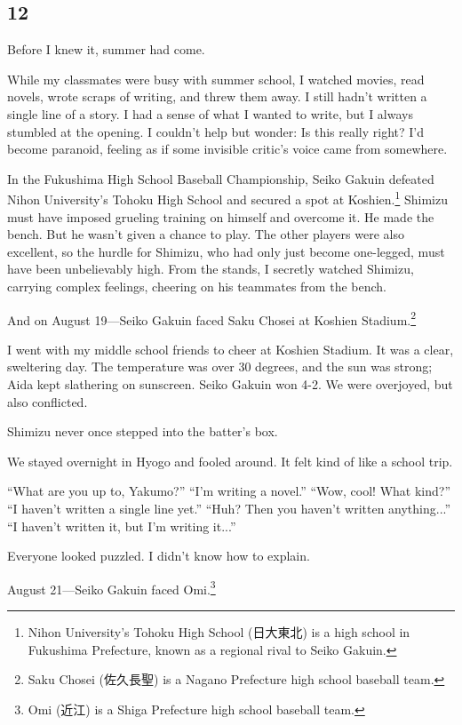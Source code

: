 \documentclass[
    a4paper,
    12pt,
    twoside,
    openany,
    UTF8,
    fontset=windows
]{ctexbook}
\begin{document}
\subsection*{12}

Before I knew it, summer had come.

While my classmates were busy with summer school, I watched movies, read novels, wrote scraps of writing, and threw them away. I still hadn't written a single line of a story. I had a sense of what I wanted to write, but I always stumbled at the opening. I couldn't help but wonder: Is this really right? I'd become paranoid, feeling as if some invisible critic's voice came from somewhere.

In the Fukushima High School Baseball Championship, Seiko Gakuin defeated Nihon University's Tohoku High School and secured a spot at Koshien.\footnote{Nihon University's Tohoku High School (日大東北) is a high school in Fukushima Prefecture, known as a regional rival to Seiko Gakuin.} Shimizu must have imposed grueling training on himself and overcome it. He made the bench. But he wasn't given a chance to play. The other players were also excellent, so the hurdle for Shimizu, who had only just become one-legged, must have been unbelievably high. From the stands, I secretly watched Shimizu, carrying complex feelings, cheering on his teammates from the bench.

And on August 19---Seiko Gakuin faced Saku Chosei at Koshien Stadium.\footnote{Saku Chosei (佐久長聖) is a Nagano Prefecture high school baseball team.}

I went with my middle school friends to cheer at Koshien Stadium. It was a clear, sweltering day. The temperature was over 30 degrees, and the sun was strong; Aida kept slathering on sunscreen. Seiko Gakuin won 4-2. We were overjoyed, but also conflicted.

Shimizu never once stepped into the batter's box.

We stayed overnight in Hyogo and fooled around. It felt kind of like a school trip.

``What are you up to, Yakumo?'' ``I'm writing a novel.'' ``Wow, cool! What kind?'' ``I haven't written a single line yet.'' ``Huh? Then you haven't written anything...'' ``I haven't written it, but I'm writing it...''

Everyone looked puzzled. I didn't know how to explain.

August 21---Seiko Gakuin faced Omi.\footnote{Omi (近江) is a Shiga Prefecture high school baseball team.}
\end{document}
